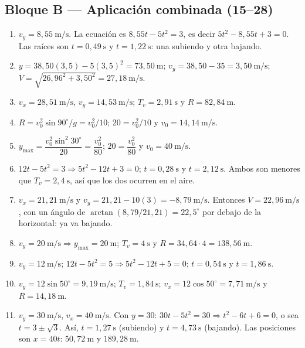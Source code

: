 \documentclass[12pt, letterpaper]{article}
\providecommand{\sen}{\sin}
\begin{document}
\subsection*{Bloque B — Aplicación combinada (15--28)}
\begin{enumerate}[leftmargin=*, label=\textbf{\arabic*.}, start=15]
  \item $v_y=8{,}55\ \text{m/s}$. La ecuación es
        $8{,}55t-5t^2=3$, es decir $5t^2-8{,}55t+3=0$. Las raíces son
        $t=0{,}49\ \text{s}$ y $t=1{,}22\ \text{s}$: una subiendo y otra
        bajando.
  \item $y=38{,}50(3{,}5)-5(3{,}5)^2=73{,}50\ \text{m}$;
        $v_y=38{,}50-35=3{,}50\ \text{m/s}$;
        $V=\sqrt{26{,}96^2+3{,}50^2}=27{,}18\ \text{m/s}$.
  \item $v_x=28{,}51\ \text{m/s}$, $v_y=14{,}53\ \text{m/s}$;
        $T_v=2{,}91\ \text{s}$ y $R=82{,}84\ \text{m}$.
  \item $R=v_0^2\sen90^\circ/g=v_0^2/10$; $20=v_0^2/10$ y
        $v_0=14{,}14\ \text{m/s}$.
  \item $y_{\max}=\dfrac{v_0^2\sen^2 30^\circ}{20}
        =\dfrac{v_0^2}{80}$; $20=\dfrac{v_0^2}{80}$ y
        $v_0=40\ \text{m/s}$.
  \item $12t-5t^2=3\Rightarrow5t^2-12t+3=0$; $t=0{,}28\ \text{s}$ y
        $t=2{,}12\ \text{s}$. Ambos son menores que $T_v=2{,}4\ \text{s}$,
        así que los dos ocurren en el aire.
  \item $v_x=21{,}21\ \text{m/s}$ y
        $v_y=21{,}21-10(3)=-8{,}79\ \text{m/s}$. Entonces
        $V=22{,}96\ \text{m/s}$, con un ángulo de
        $\arctan(8{,}79/21{,}21)=22{,}5^\circ$ por debajo de la horizontal:
        ya va bajando.
  \item $v_y=20\ \text{m/s}\Rightarrow y_{\max}=20\ \text{m}$;
        $T_v=4\ \text{s}$ y $R=34{,}64\cdot4=138{,}56\ \text{m}$.
  \item $v_y=12\ \text{m/s}$; $12t-5t^2=5\Rightarrow5t^2-12t+5=0$;
        $t=0{,}54\ \text{s}$ y $t=1{,}86\ \text{s}$.
  \item $v_y=12\sen50^\circ=9{,}19\ \text{m/s}$; $T_v=1{,}84\ \text{s}$;
        $v_x=12\cos50^\circ=7{,}71\ \text{m/s}$ y
        $R=14{,}18\ \text{m}$.
  \item $v_y=30\ \text{m/s}$, $v_x=40\ \text{m/s}$. Con $y=30$:
        $30t-5t^2=30\Rightarrow t^2-6t+6=0$, o sea
        $t=3\pm\sqrt3$. Así, $t=1{,}27\ \text{s}$ (subiendo) y
        $t=4{,}73\ \text{s}$ (bajando). Las posiciones son
        $x=40t$: $50{,}72\ \text{m}$ y $189{,}28\ \text{m}$.

\end{enumerate}
\end{document}
